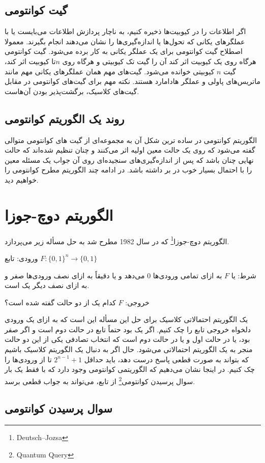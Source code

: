 \subsection{گیت کوانتومی}
 اگر اطلاعات را در کیوبیت‌ها ذخیره کنیم، به ناچار پردازش اطلاعات می‌بایست
یا با عملگرهای یکانی که تحول‌ها یا اندازه‌گیری‌ها را نشان می‌دهند انجام بگیرند. معمولا اصطلاح گیت کوانتومی برای یک عملگر یکانی به‌ کار برده می‌شود. گیت کوانتومی هرگاه روی یک کیوبیت اثر کند آن را گیت تک کیوبیتی و هرگاه روی $n$تا کیوبیت اثر کند، گیت $n$ کیوبیتی خوانده می‌شود.  گیت‌های مهم همان عملگرهای یکانی مهم مانند ماتریس‌های پاولی و عملگر هادامارد هستند. نکته مهم برای گیت‌های کوانتومی در مقابل گیت‌های کلاسیک، برگشت‌پذیر بودن‌ آن‌هاست. 

\subsection{روند یک الگوریتم کوانتومی}
 الگوریتم کوانتومی در ساده ترین شکل آن به مجموعه‌ای از گیت های کوانتومی متوالی گفته می‌شود که روی یک حالت معین اولیه اثر می‌کنند و چنان تنظیم شده‌اند که حالت نهایی چنان باشد که پس از اندازه‌گیری‌های سنجیده‌ای روی آن جواب یک مسئله معین را با احتمال بسیار خوب در بر داشته باشد. 
 در ادامه چند الگوریتم مطرح کوانتومی را خواهیم دید. 
 
 \section{الگوریتم دوچ-جوزا}
 الگوریتم دوچ-جوزا\footnote{Deutsch–Jozsa} که در سال 1982 مطرح شد به حل مسأله زیر می‌پردازد. 
 
 ورودی: تابع $F: \{0,1\}^{n} \to \{0,1\}$ 
 
شرط: یا $F$ به ازای تمامی ورودی‌ها $0$ می‌دهد و یا دقیقاً به ازای نصف ورودی‌ها صفر و به ازای نصف دیگر یک است. 

  خروجی: $F$ کدام یک از دو حالت گفته شده است؟
  
  یک الگوریتم احتمالاتی کلاسیک برای حل این مسأله این است که به ازای یک ورودی دلخواه خروجی تابع را چک
کنیم. اگر یک بود حتماً تابع در حالت دوم است و اگر صفر بود، یا در حالت اول و یا در حالت دوم است که انتخاب
تصادفی یکی از این دو حالت منجر به یک الگوریتم احتمالاتی می‌شود. حال اگر به دنبال یک الگوریتم کلاسیک باشیم که بتواند به صورت قطعی پاسخ درست دهد، باید حداقل $2^{n-1} + 1$ تا از ورودی‌ها را چک کنیم. در اینجا نشان می‌دهیم  که الگوریتمی کوانتومی وجود دارد که با فقط یک بار سوال پرسیدن کوانتومی\footnote{Quantum Query} از تابع، می‌تواند به جواب قطعی برسد.
 
  \subsection{سوال پرسیدن کوانتومی}

